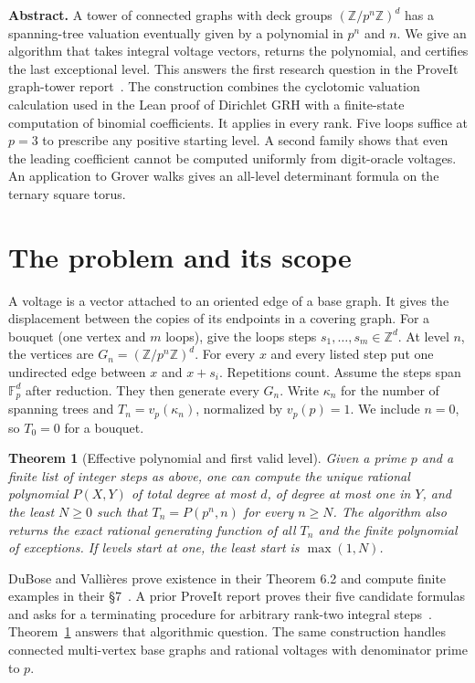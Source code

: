 \documentclass[11pt,letterpaper]{article}
\newtheorem{theorem}{Theorem}\newtheorem{lemma}[theorem]{Lemma}\newtheorem{corollary}[theorem]{Corollary}
\newcommand{\Z}{\mathbb Z}\newcommand{\Q}{\mathbb Q}\newcommand{\F}{\mathbb F}
\begin{document}
\thispagestyle{plain}
\par
\vspace{.15in}
\par
\vspace{3pt}
\par
\vspace{.16in}
\noindent\textbf{Abstract.}
A tower of connected graphs with deck groups $(\Z/p^n\Z)^d$ has a spanning-tree valuation eventually given by a polynomial in $p^n$ and $n$. We give an algorithm that takes integral voltage vectors, returns the polynomial, and certifies the last exceptional level. This answers the first research question in the ProveIt graph-tower report~\cite{incoming}. The construction combines the cyclotomic valuation calculation used in the Lean proof of Dirichlet GRH with a finite-state computation of binomial coefficients. It applies in every rank. Five loops suffice at $p=3$ to prescribe any positive starting level. A second family shows that even the leading coefficient cannot be computed uniformly from digit-oracle voltages. An application to Grover walks gives an all-level determinant formula on the ternary square torus.

\section{The problem and its scope}
A voltage is a vector attached to an oriented edge of a base graph. It gives the displacement between the copies of its endpoints in a covering graph. For a bouquet (one vertex and $m$ loops), give the loops steps $s_1,\ldots,s_m\in\Z^d$. At level $n$, the vertices are $G_n=(\Z/p^n\Z)^d$. For every $x$ and every listed step put one undirected edge between $x$ and $x+s_i$. Repetitions count. Assume the steps span $\F_p^d$ after reduction. They then generate every $G_n$. Write $\kappa_n$ for the number of spanning trees and $T_n=v_p(\kappa_n)$, normalized by $v_p(p)=1$. We include $n=0$, so $T_0=0$ for a bouquet.

\begin{theorem}[Effective polynomial and first valid level]\label{thm:main}
Given a prime $p$ and a finite list of integer steps as above, one can compute the unique rational polynomial $P(X,Y)$ of total degree at most $d$, of degree at most one in $Y$, and the least $N\ge0$ such that $T_n=P(p^n,n)$ for every $n\ge N$. The algorithm also returns the exact rational generating function of all $T_n$ and the finite polynomial of exceptions. If levels start at one, the least start is $\max(1,N)$.
\end{theorem}
DuBose and Vallières prove existence in their Theorem 6.2 and compute finite examples in their \S7~\cite{DV}. A prior ProveIt report proves their five candidate formulas and asks for a terminating procedure for arbitrary rank-two integral steps~\cite{incoming}. Theorem~\ref{thm:main} answers that algorithmic question. The same construction handles connected multi-vertex base graphs and rational voltages with denominator prime to $p$.
\end{document}

